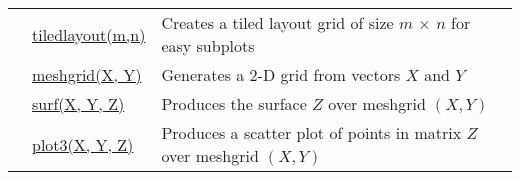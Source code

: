 \documentclass[../MATLAB_Primer.tex]{subfiles}
\begin{document}
\begin{longtable}{| C{2cm} | C{2.8cm} | p{11cm}|}
            & \href{https://www.mathworks.com/help/matlab/ref/subplot.html}{\color{blue}tiledlayout(m,n)} & Creates a tiled layout grid of size $m$ $\times$ $n$ for easy subplots\\
            
            & \href{https://www.mathworks.com/help/matlab/ref/meshgrid.html}{\color{blue}meshgrid(X, Y)} & Generates a 2-D grid from vectors $X$ and $Y$\\
            
            & \href{https://www.mathworks.com/help/matlab/ref/surf.html}{\color{blue}surf(X, Y, Z)} & Produces the surface $Z$ over meshgrid $(X,Y)$ \\
            
            & \href{https://www.mathworks.com/help/matlab/ref/plot3.html}{\color{blue}plot3(X, Y, Z)} & Produces a scatter plot of points in matrix $Z$ over meshgrid $(X,Y)$ \\
            \hline
\end{longtable}
\end{document}
